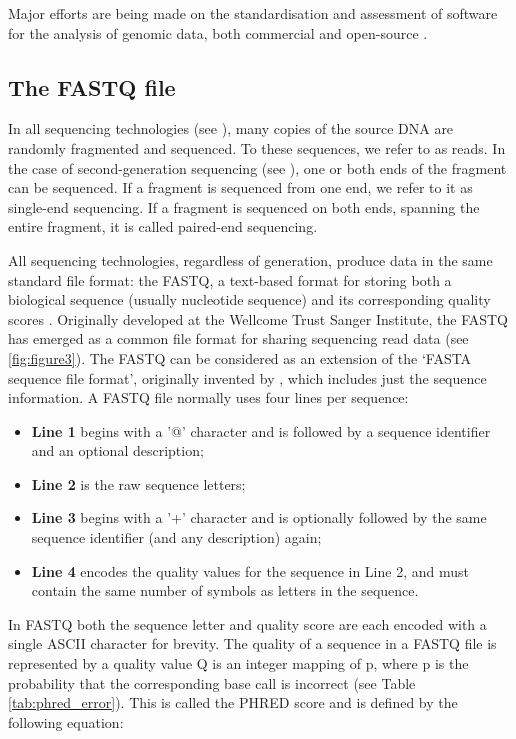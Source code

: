 Major efforts are being made on the standardisation and assessment of software for the analysis of genomic data, both commercial and open-source \cite{angers-loustau_challenges_2018, gruening_recommendations_2019, sczyrba_critical_2017, couto_critical_2018}. 

\subsection{The FASTQ file} \label{ssec:_intro_fastq}

In all sequencing technologies (see ), many copies of the source DNA are randomly fragmented and sequenced. To these sequences, we refer to as reads. In the case of second-generation sequencing (see ), one or both ends of the fragment can be sequenced. If a fragment is sequenced from one end, we refer to it as single-end sequencing. If a fragment is sequenced on both ends, spanning the entire fragment, it is called paired-end sequencing.

All sequencing technologies, regardless of generation, produce data in the same standard file format: the FASTQ, a text-based format for storing both a biological sequence (usually nucleotide sequence) and its corresponding quality scores \citep{cock_sanger_2010}. Originally developed at the Wellcome Trust Sanger Institute, the FASTQ has emerged as a common file format for sharing sequencing read data (see \ref{fig:figure3}). The FASTQ can be considered as an extension of the ‘FASTA sequence file format’, originally invented by \cite{pearson_improved_1988}, which includes just the sequence information. A FASTQ file normally uses four lines per sequence:

\begin{itemize}
    \item \textbf{Line 1} begins with a '@' character and is followed by a sequence identifier and an optional description;
    \item \textbf{Line 2} is the raw sequence letters;
    \item \textbf{Line 3} begins with a '+' character and is optionally followed by the same sequence identifier (and any description) again;
    \item \textbf{Line 4} encodes the quality values for the sequence in Line 2, and must contain the same number of symbols as letters in the sequence.
\end{itemize}

In FASTQ both the sequence letter and quality score are each encoded with a single ASCII character for brevity. The quality of a sequence in a FASTQ file is represented by a quality value Q is an integer mapping of p, where p is the probability that the corresponding base call is incorrect (see Table \ref{tab:phred_error}). This is called the PHRED score \citep{ewing_base-calling_1998} and is defined by the following equation:

